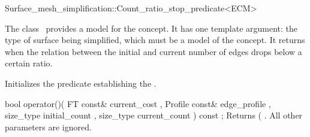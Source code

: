 

\begin{ccRefClass}{Surface_mesh_simplification::Count_ratio_stop_predicate<ECM>}


\ccDefinition

The class \ccRefName\ provides a model for the  concept.
It has one template argument: the type of surface being simplified,
which must be a model of the  concept.
It returns  when the relation between the initial and current number 
of edges drops below a certain ratio.


\ccIsModel
{}

\ccCreation
{}  %

{Initializes the predicate establishing the .} 

\ccOperations

  \ccMemberFunction
    {bool operator()( FT const&      current_cost
                    , Profile const& edge_profile
                    , size_type      initial_count
                    , size_type      current_count
                    ) const ;
           }
  {Returns ( . All other parameters are ignored.}

\ccSeeAlso
{}

\end{ccRefClass}


